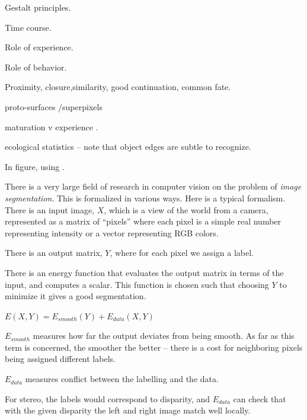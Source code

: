 Gestalt principles.

Time course.

Role of experience.

Role of behavior.

Proximity, closure,similarity, good continuation, common fate.

proto-surfaces /superpixels

maturation v experience \cite{quinn05learning}.

ecological statistics \cite{martin04learning} -- note
that object edges are subtle to recognize.

In figure, using \cite{felzenszwalb04efficient}.

There is a very large field of research in computer vision on the
problem of {\it image segmentation}.  This is formalized in various
ways.  Here is a typical formalism.  There is an input image, $X$,
which is a view of the world from a camera, represented
as a matrix of ``pixels'' where each pixel is a simple
real number representing intensity or a vector representing
RGB colors.

There is an output matrix, $Y$, where for each pixel we assign
a label.

There is an energy function that evaluates the output matrix
in terms of the input, and computes a scalar.  This function
is chosen such that choosing $Y$ to minimize it gives a
good segmentation.

$E(X,Y) = E_{smooth}(Y) + E_{data}(X,Y)$

$E_{smooth}$ measures how far the output deviates from being
smooth.  As far as this term is concerned, the smoother the
better -- there is a cost for neighboring pixels being 
assigned different labels.

$E_{data}$ measures conflict between the labelling and
the data.  

For stereo, the labels would correspond to disparity,
and $E_{data}$ can check that with the given disparity
the left and right image match well locally.
